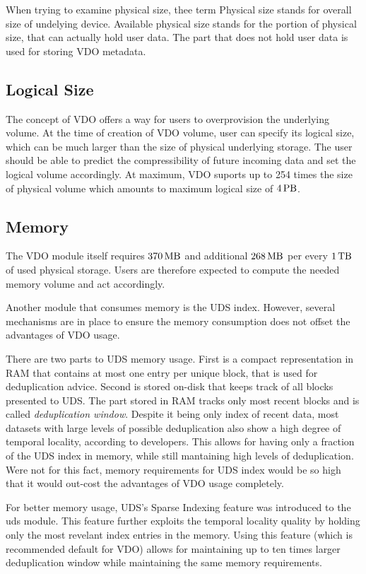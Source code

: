 \documentclass[
  color, %
  table, %
  lof,   %
  lot,   %
]{fithesis3}
\begin{document}
When trying to examine physical size, thee term Physical size stands for overall size of undelying device. Available physical size stands for the portion of physical size, that can actually hold user data. The part that does not hold user data is used for storing VDO metadata.

\subsection{Logical Size}
The concept of VDO offers a way for users to overprovision the underlying volume. At the time of creation of VDO volume, user can specify its logical size, which can be much larger than the size of physical underlying storage. The user should be able to predict the compressibility of future incoming data and set the logical volume accordingly. At maximum, VDO suports up to 254 times the size of physical volume which amounts to maximum logical size of $\SI{4}{\peta\byte}$.

\subsection{Memory}
The VDO module itself requires $\SI{370}{\mega\byte}$ and additional $\SI{268}{\mega\byte}$ per every $\SI{1}{\tera\byte}$ of used physical storage. Users are therefore expected to compute the needed memory volume and act accordingly.

Another module that consumes memory is the UDS index. However, several mechanisms are in place to ensure the memory consumption does not offset the advantages of VDO usage.

There are two parts to UDS memory usage. First is a compact representation in RAM that contains at most one entry per unique block, that is used for deduplication advice. Second is stored on-disk that keeps track of all blocks presented to UDS. The part stored in RAM tracks only most recent blocks and is called \emph{deduplication window}. Despite it being only index of recent data, most datasets with large levels of possible deduplication also show a high degree of temporal locality, according to developers. This allows for having only a fraction of the UDS index in memory, while still mantaining high levels of deduplication. Were not for this fact, memory requirements for UDS index would be so high that it would out-cost the advantages of VDO usage completely.

For better memory usage, UDS's Sparse Indexing feature was introduced to the uds module. This feature further exploits the temporal locality quality by holding only the most revelant index entries in the memory. Using this feature (which is recommended default for VDO) allows for maintaining up to ten times larger deduplication window while maintaining the same memory requirements.
\end{document}
